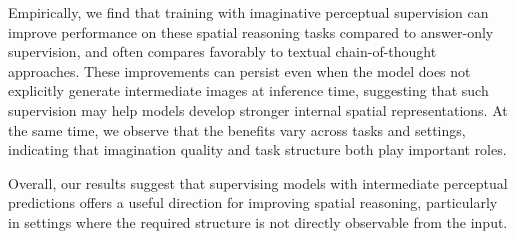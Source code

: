 Empirically, we find that training with imaginative perceptual supervision can improve performance on these spatial reasoning tasks compared to answer-only supervision, and often compares favorably to textual chain-of-thought approaches. These improvements can persist even when the model does not explicitly generate intermediate images at inference time, suggesting that such supervision may help models develop stronger internal spatial representations. At the same time, we observe that the benefits vary across tasks and settings, indicating that imagination quality and task structure both play important roles.

Overall, our results suggest that supervising models with intermediate perceptual predictions offers a useful direction for improving spatial reasoning, particularly in settings where the required structure is not directly observable from the input.

